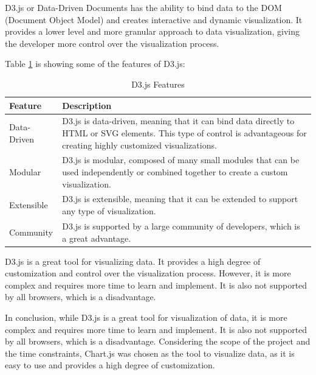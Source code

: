 D3.js or Data-Driven Documents has the ability to bind data to the DOM (Document Object Model) and creates interactive and dynamic visualization. It provides 
a lower level and more granular approach to data visualization, giving the developer more control over the visualization process. 

Table \ref{tab:d3-js-features} is showing some of the features of D3.js\cite{d3}:

\begin{table}[H]
    \centering

    \begin{tabularx}{\textwidth}{|l|X|}
        \hline
        \textbf{Feature} & \textbf{Description}                                                                                                                                                      \\
        \hline
        Data-Driven      & D3.js is data-driven, meaning that it can bind data directly to HTML or SVG elements. This type of control is advantageous for creating highly customized visualizations. \\
        \hline
        Modular          & D3.js is modular, composed of many small modules that can be used independently or combined together to create a custom visualization.                                    \\
        \hline
        Extensible       & D3.js is extensible, meaning that it can be extended to support any type of visualization.                                                                                \\
        \hline
        Community        & D3.js is supported by a large community of developers, which is a great advantage.                                                                                        \\
        \hline
    \end{tabularx}
    \label{tab:d3-js-features}
    \caption{D3.js Features}
\end{table}


D3.js is a great tool for visualizing data. It provides a high degree of customization and control over the visualization process. However, it is more complex and requires more time to learn and implement. It is also not supported by all browsers, which is a disadvantage.

In conclusion, while D3.js is a great tool for visualization of data, it is more complex and requires more time to learn and implement. It is also not 
supported by all browsers, which is a disadvantage. Considering the scope of the project and the time constraints, Chart.js was chosen as the tool 
to visualize data, as it is easy to use and provides a high degree of customization.

